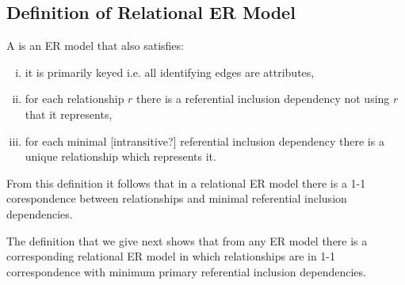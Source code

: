 \subsection{Definition of Relational ER Model}
\begin{definition}
\noindent 
A  is an  ER model that also satisfies:
\begin{enumerate}[(i)]
\item
it is primarily keyed i.e. all identifying edges are attributes, 
\item
for each relationship $r$ there is a referential inclusion dependency not using $r$ that it represents,
\vspace{1cm}
\item 
for each minimal [intransitive?]  referential inclusion dependency there is a unique relationship which represents it.
\end{enumerate} 
\end{definition}
\begin{remark}
From this definition it follows that in a relational ER model there is a 1-1 corespondence between relationships
and minimal referential inclusion dependencies.
\end{remark}
The definition that we give next shows that from any ER model there is a corresponding relational ER model in which relationships are in 1-1 correspondence with minimum primary referential inclusion dependencies. 

\iffalse
\subsection{First Cut Chen Transformation -- $\chiZero$}

\begin{align}
&\et[\chiZeroM]        && = \et        && \\
&\rel[\chiZeroM]{x}{y} && = \rel{x}{y}  &&\\
&\attr[\chiZeroM]{x}   && = \attr{x}  \cup  \setsuchthat{\tuple{r,k}}{\text{for some }
			                  y \in \et, \ r \in \rel{x}{y} \text{ and } k \in \pk{y}} 
\end{align}

Alternatively, we can define $\attr[\chiZeroM]{x}$ as the union of $\attr{x}$ and foreign keys $\fk{x}$
where we define the latter by:
\begin{equation}
\fk{x} = \setsuchthat{\tuple{r,q_1,...q_n,a}}
                               {r \in \rel{x}{y},
                                  \text{ for some } y \in \et,
																	\text{ and } \tuple{q_1,...q_n,a} \in \pk{y},
																	\text{ for some } n \geq 0
			                   }
\end{equation}
\fi

